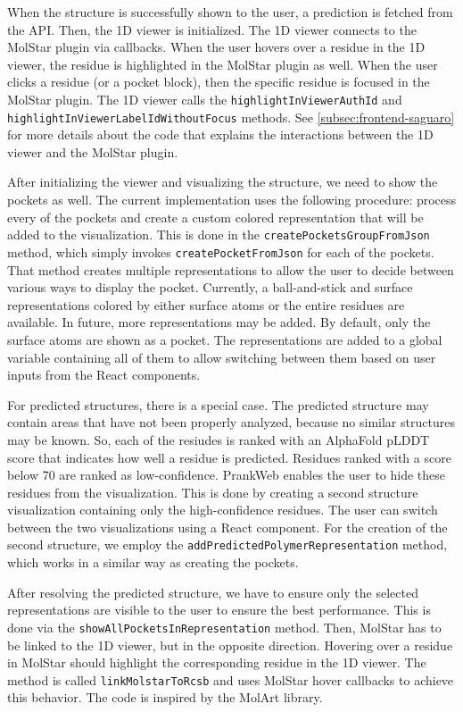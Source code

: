When the structure is successfully shown to the user, a prediction is fetched from the API. Then, the 1D viewer is initialized. The 1D viewer connects to the MolStar plugin via callbacks. When the user hovers over a residue in the 1D viewer, the residue is highlighted in the MolStar plugin as well. When the user clicks a residue (or a pocket block), then the specific residue is focused in the MolStar plugin. The 1D viewer calls the \texttt{highlightInViewerAuthId} and \texttt{highlightInViewerLabelIdWithoutFocus} methods. See \cref{subsec:frontend-saguaro} for more details about the code that explains the interactions between the 1D viewer and the MolStar plugin.

After initializing the viewer and visualizing the structure, we need to show the pockets as well. The current implementation uses the following procedure: process every of the pockets and create a custom colored representation that will be added to the visualization. This is done in the \texttt{createPocketsGroupFromJson} method, which simply invokes \texttt{createPocketFromJson} for each of the pockets. That method creates multiple representations to allow the user to decide between various ways to display the pocket. Currently, a ball-and-stick and surface representations colored by either surface atoms or the entire residues are available. In future, more representations may be added. By default, only the surface atoms are shown as a pocket. The representations are added to a global variable containing all of them to allow switching between them based on user inputs from the React components.

For predicted structures, there is a special case. The predicted structure may contain areas that have not been properly analyzed, because no similar structures may be known. So, each of the resiudes is ranked with an AlphaFold pLDDT score that indicates how well a residue is predicted. Residues ranked with a score below 70 are ranked as low-confidence. \cite{jumper2021highly} PrankWeb enables the user to hide these residues from the visualization. This is done by creating a second structure visualization containing only the high-confidence residues. The user can switch between the two visualizations using a React component. For the creation of the second structure, we employ the \texttt{addPredictedPolymerRepresentation} method, which works in a similar way as creating the pockets.

After resolving the predicted structure, we have to ensure only the selected representations are visible to the user to ensure the best performance. This is done via the \texttt{showAllPocketsInRepresentation} method. Then, MolStar has to be linked to the 1D viewer, but in the opposite direction. Hovering over a residue in MolStar should highlight the corresponding residue in the 1D viewer. The method is called \texttt{linkMolstarToRcsb} and uses MolStar hover callbacks to achieve this behavior. The code is inspired by the MolArt library. \cite{molart}

